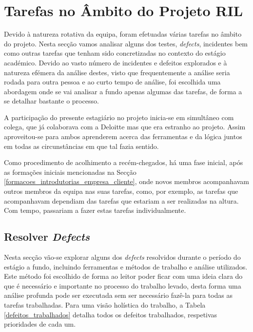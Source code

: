 \section{Tarefas no Âmbito do Projeto RIL}\label{sec:def_e_inc}

    Devido à natureza rotativa da equipa, foram efetuadas várias tarefas no âmbito do projeto. Nesta secção vamos analisar alguns dos testes, \textit{defects}, incidentes bem como outras tarefas que tenham sido concretizadas no contexto do estágio académico. Devido ao vasto número de incidentes e defeitos explorados e à natureza efémera da análise destes, visto que frequentemente a análise seria rodada para outra pessoa e ao curto tempo de análise, foi escolhida uma abordagem onde se vai analisar a fundo apenas algumas das tarefas, de forma a se detalhar bastante o processo.

    A participação do presente estagiário no projeto inicia-se em simultâneo com colega, que já colaborava com a Deloitte mas que era estranho ao projeto. Assim aproveitou-se para ambos aprenderem acerca das ferramentas e da lógica juntos em todas as circunstâncias em que tal fazia sentido.

    Como procedimento de acolhimento a recém-chegados, há uma fase inicial, após as formações iniciais mencionadas na Secção \ref{formacoes_introdutorias_empresa_cliente}, onde novos membros acompanhavam outros membros da equipa nas suas tarefas, como, por exemplo, as tarefas que acompanhavam dependiam das tarefas que estariam a ser realizadas na altura. Com tempo, passariam a fazer estas tarefas individualmente.

    \subsection{Resolver \textit{Defects}}\label{sub:defects}

        Nesta secção vão-se explorar alguns dos \textit{defects} resolvidos durante o período do estágio a fundo, incluindo ferramentas e métodos de trabalho e análise utilizados. Este método foi escolhido de forma ao leitor poder ficar com uma ideia clara do que é necessário e importante no processo do trabalho levado, desta forma uma análise profunda pode ser executada sem ser necessário fazê-la para todas as tarefas trabalhadas. Para uma visão holística do trabalho, a Tabela \ref{defeitos_trabalhados} detalha todos os defeitos trabalhados, respetivas prioridades de cada um.
        
